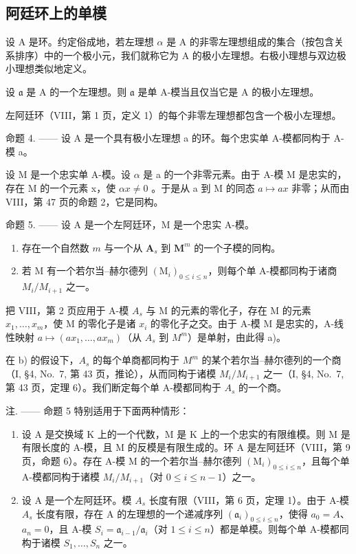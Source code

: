 \subsection{阿廷环上的单模}

设 A 是环。约定俗成地，若左理想 \(\alpha\) 是 A 的非零左理想组成的集合（按包含关系排序）中的一个极小元，我们就称它为 A 的极小左理想。右极小理想与双边极小理想类似地定义。

设 \(\mathfrak{a}\) 是 A 的一个左理想。则 \(\mathfrak{a}\) 是单 A-模当且仅当它是 A 的极小左理想。

左阿廷环（VIII，第 1 页，定义 1）的每个非零左理想都包含一个极小左理想。

命题 4. —— 设 A 是一个具有极小左理想 a 的环。每个忠实单 A-模都同构于 A-模 a。

设 M 是一个忠实单 A-模。设 \(\alpha\) 是 a 的一个非零元素。由于 A-模 M 是忠实的，存在 M 的一个元素 x，使 \(\alpha x \neq 0\) 。于是从 a 到 M 的同态 \(a \mapsto ax\) 非零；从而由 VIII，第 47 页的命题 2，它是同构。

命题 5. —— 设 A 是一个左阿廷环，M 是一个忠实 A-模。

\begin{enumerate}
\def\labelenumi{\alph{enumi})}
\item
  存在一个自然数 \(m\) 与一个从 \(\mathbf{A}_s\) 到 \(\mathbf{M}^m\) 的一个子模的同构。
\item
  若 M 有一个若尔当–赫尔德列 \((\mathrm{M}_{i})_{0\leqslant i\leqslant n}\)，则每个单 A-模都同构于诸商 \(M_{i}/M_{i+1}\) 之一。
\end{enumerate}

把 VIII，第 2 页应用于 A-模 \(A_{s}\) 与 M 的元素的零化子，存在 M 的元素 \(x_{1},\ldots,x_{m}\)，使 M 的零化子是诸 \(x_{i}\) 的零化子之交。由于 A-模 M 是忠实的，A-线性映射 \(a\mapsto(ax_{1},\ldots,ax_{m})\)（从 \(A_{s}\) 到 \(M^{m}\)）是单射，由此得 a)。

在 b) 的假设下，\(A_{s}\) 的每个单商都同构于 \(M^{m}\) 的某个若尔当–赫尔德列的一个商（I, §4, No.~7, 第 43 页，推论），从而同构于诸模 \(M_{i}/M_{i+1}\) 之一（I, §4, No.~7, 第 43 页，定理 6）。我们断定每个单 A-模都同构于 \(A_{s}\) 的一个商。

注. —— 命题 5 特别适用于下面两种情形：

\begin{enumerate}
\def\labelenumi{\alph{enumi})}
\item
  设 A 是交换域 K 上的一个代数，M 是 K 上的一个忠实的有限维模。则 M 是有限长度的 A-模，且 M 的反模是有限生成的。环 A 是左阿廷环（VIII，第 9 页，命题 6）。存在 A-模 M 的一个若尔当–赫尔德列 \((\mathrm{M}_{i})_{0\leqslant i\leqslant n}\)，且每个单 A-模都同构于诸模 \(M_{i}/M_{i+1}\)（对 \(0\leqslant i\leqslant n-1\)）之一。
\item
  设 A 是一个左阿廷环。模 \(A_{s}\) 长度有限（VIII，第 6 页，定理 1）。由于 A-模 \(A_{s}\) 长度有限，存在 A 的左理想的一个递减序列 \((\mathfrak{a}_{i})_{0\leqslant i\leqslant n}\)，使得 \(a_{0}=A\)、\(a_{n}=0\)，且 A-模 \(S_{i}=\mathfrak{a}_{i-1}/\mathfrak{a}_{i}\)（对 \(1\leqslant i\leqslant n\)）都是单模。则每个单 A-模都同构于诸模 \(S_{1},\ldots,S_{n}\) 之一。
\end{enumerate}


